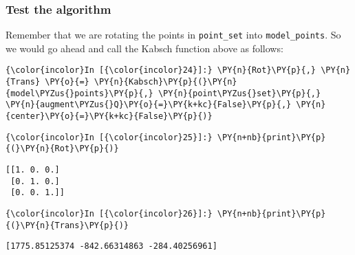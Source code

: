     \subsubsection{Test the algorithm}\label{test-the-algorithm}

Remember that we are rotating the points in \texttt{point\_set} into
\texttt{model\_points}. So we would go ahead and call the Kabsch
function above as follows:

    \begin{Verbatim}[commandchars=\\\{\}]
{\color{incolor}In [{\color{incolor}24}]:} \PY{n}{Rot}\PY{p}{,} \PY{n}{Trans} \PY{o}{=} \PY{n}{Kabsch}\PY{p}{(}\PY{n}{model\PYZus{}points}\PY{p}{,} \PY{n}{point\PYZus{}set}\PY{p}{,} \PY{n}{augment\PYZus{}Q}\PY{o}{=}\PY{k+kc}{False}\PY{p}{,} \PY{n}{center}\PY{o}{=}\PY{k+kc}{False}\PY{p}{)}
\end{Verbatim}


    \begin{Verbatim}[commandchars=\\\{\}]
{\color{incolor}In [{\color{incolor}25}]:} \PY{n+nb}{print}\PY{p}{(}\PY{n}{Rot}\PY{p}{)}
\end{Verbatim}


    \begin{Verbatim}[commandchars=\\\{\}]
[[1. 0. 0.]
 [0. 1. 0.]
 [0. 0. 1.]]

    \end{Verbatim}

    \begin{Verbatim}[commandchars=\\\{\}]
{\color{incolor}In [{\color{incolor}26}]:} \PY{n+nb}{print}\PY{p}{(}\PY{n}{Trans}\PY{p}{)}
\end{Verbatim}


    \begin{Verbatim}[commandchars=\\\{\}]
[1775.85125374 -842.66314863 -284.40256961]

    \end{Verbatim}


    